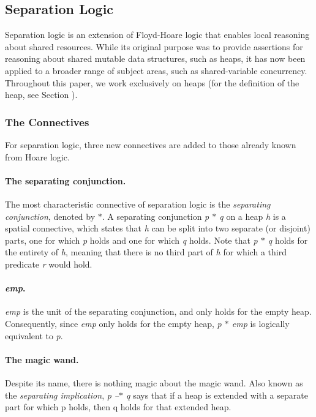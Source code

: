 \subsection{Separation Logic}
Separation logic is an extension of Floyd-Hoare logic that enables local reasoning about shared resources. While its original purpose was to provide assertions for reasoning about shared mutable data structures, such as heaps, it has now been applied to a broader range of subject areas, such as shared-variable concurrency. Throughout this paper, we work exclusively on heaps (for the definition of the heap, see Section ).

\subsubsection{The Connectives}
For separation logic, three new connectives are added to those already known from Hoare logic. 
\paragraph{The separating conjunction.}
The most characteristic connective of separation logic is the {\it separating conjunction}, denoted by {\it $\ast$}. A separating conjunction {\it p $\ast$ q} on a heap {\it h} is a spatial connective, which states that {\it h} can be split into two separate (or disjoint) parts, one for which {\it p} holds and one for which {\it q} holds. Note that {\it p $\ast$ q} holds for the entirety of {\it h}, meaning that there is no third part of {\it h} for which a third predicate {\it r} would hold.

\paragraph{{\it emp}.}
{\it emp} is the unit of the separating conjunction, and only holds for the empty heap. Consequently, since {\it emp} only holds for the empty heap, {\it p $\ast$ emp} is logically equivalent to {\it p}.

\paragraph{The magic wand.}
Despite its name, there is nothing magic about the magic wand. Also known as the {\it separating implication}, {\it p --$\ast$ q} says that if a heap is extended with a separate part for which p holds, then q holds for that extended heap.

